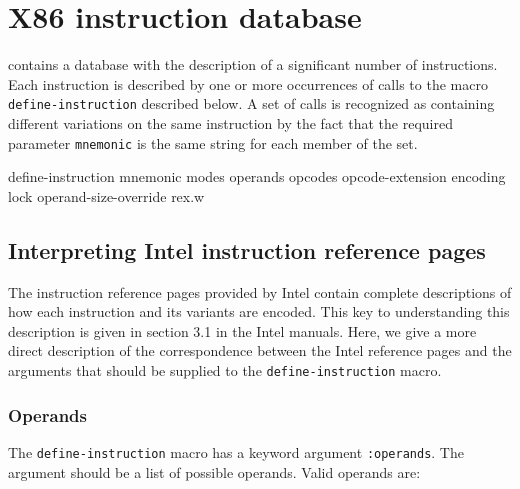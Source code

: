 \chapter{X86 instruction database}

\sysname{} contains a database with the description of a significant
number of instructions.  Each instruction is described by one or more
occurrences of calls to the macro \texttt{define-instruction}
described below.  A set of calls is recognized as containing different
variations on the same instruction by the fact that the required
parameter \texttt{mnemonic} is the same string for each member of the
set.

 define-instruction {mnemonic \key 
				       modes
				       operands
				       opcodes
				       opcode-extension
				       encoding
				       lock
				       operand-size-override
				       rex.w}

\section{Interpreting Intel instruction reference pages}

The instruction reference pages provided by Intel contain complete
descriptions of how each instruction and its variants are encoded.
This key to understanding this description is given in section 3.1 in
the Intel manuals.  Here, we give a more direct description of the
correspondence between the Intel reference pages and the arguments
that should be supplied to the \texttt{define-instruction} macro.

\subsection{Operands}

The \texttt{define-instruction} macro has a keyword argument
\texttt{:operands}.  The argument should be a list of possible
operands.  Valid operands are:


